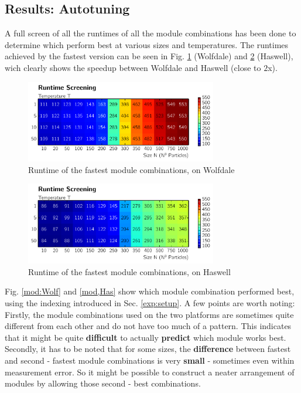 \documentclass[letterpaper]{article}
\begin{document}
\subsection{Results: Autotuning}
A full screen of all the runtimes of all the module combinations has been done to determine which perform best at various sizes and temperatures. The runtimes achieved by the fastest version can be seen in Fig. \ref{screen:Wolf} (Wolfdale) and \ref{screen:Has} (Haswell), wich clearly shows the speedup between Wolfdale and Haswell (close to $2$x).
	\begin{figure}[h]\centering
	  \includegraphics[width = 8.36cm]{plots/matrix_msk.pdf}
	  \caption{Runtime of the fastest module combinations, on Wolfdale}
	  \label{screen:Wolf}
	\end{figure}
	\begin{figure}[h]\centering
	  \includegraphics[width = 8.36cm]{plots/matrix_dg.pdf}
	  \caption{Runtime of the fastest module combinations, on Haswell}
	  \label{screen:Has}
	\end{figure}\newline
Fig. \ref{mod:Wolf} and \ref{mod,Has} show which module combination performed best, using the indexing introduced in Sec. \ref{exp:setup}. A few points are worth noting: \newline
Firstly, the module combinations used on the two platforms are sometimes quite different from each other and do not have too much of a pattern. This indicates that it might be quite \textbf{difficult} to actually \textbf{predict} which module works best. \newline
Secondly, it has to be noted that for some sizes, the \textbf{difference} between fastest and second - fastest module combinations is very \textbf{small} - sometimes even within measurement error. So it might be possible to construct a neater arrangement of modules by allowing those second - best combinations.\newline
\end{document}
